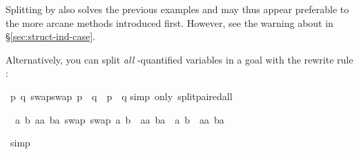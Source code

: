 \begin{isabellebody}
\begin{isamarkuptxt}
Splitting by  also solves the previous examples and may thus
appear preferable to the more arcane methods introduced first. However, see
the warning about  in \S\ref{sec:struct-ind-case}.

Alternatively, you can split \emph{all} -quantified variables
in a goal with the rewrite rule :%
\end{isamarkuptxt}%
\isamarkuptrue%
%
\endisatagproof
{\isafoldproof}%
%
\isadelimproof
%
\endisadelimproof
{}\isamarkupfalse%
\ {}{}p\ q{}\ swap{}swap\ p{}\ {}\ q\ {}\ p\ {}\ q{}\isanewline
%
\isadelimproof
%
\endisadelimproof
%
\isatagproof
{}\isamarkupfalse%
{}simp\ only{}\ split{}paired{}all{}%
\begin{isamarkuptxt}%
\noindent
\begin{isabelle}%
\ {}{}\ {}a\ b\ aa\ ba{}\ swap\ {}swap\ {}a{}\ b{}{}\ {}\ {}aa{}\ ba{}\ {}\ {}a{}\ b{}\ {}\ {}aa{}\ ba{}%
\end{isabelle}%
\end{isamarkuptxt}%
\isamarkuptrue%
\isamarkupfalse%
\ simp\isanewline
{}\isamarkupfalse%

\end{isabellebody}
